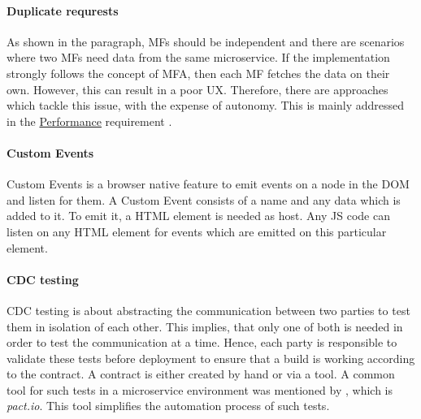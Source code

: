 \paragraph{Duplicate requrests}

As shown in the  paragraph, \acp{MF} should be independent and there are scenarios where two \acp{MF} need data from the same microservice.
If the implementation strongly follows the concept of \ac{MFA}, then each \ac{MF} fetches the data on their own.
However, this can result in a poor \ac{UX}.
Therefore, there are approaches which tackle this issue, with the expense of autonomy.
This is mainly addressed in the \hyperref[cha:requirement_detail_performance]{Performance} requirement \cite{Steyer.2019}.



\paragraph{Custom Events}\label{cha:theory_practice_customevents}

Custom Events is a browser native feature to emit events on a node in the \ac{DOM} and listen for them.
A Custom Event consists of a name and any data which is added to it.
To emit it, a \ac{HTML} element is needed as host.
Any \ac{JS} code can listen on any \ac{HTML} element for events which are emitted on this particular element\footnotemark.



\paragraph{\acl{CDC} testing}\label{cha:theory_practice_cdctesting}

\ac{CDC} testing is about abstracting the communication between two parties to test them in isolation of each other.
This implies, that only one of both is needed in order to test the communication at a time.
Hence, each party is responsible to validate these tests before deployment to ensure that a build is working according to the contract.
A contract is either created by hand or via a tool\footnotemark.
A common tool for such tests in a microservice environment was mentioned by \textcite{Laug.2018}, which is \textit{pact.io}.
This tool simplifies the automation process of such tests.



